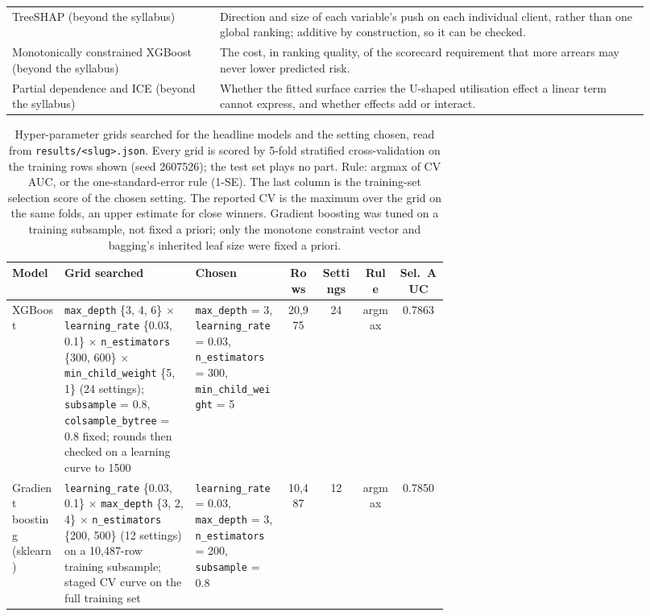 \begin{table}[htbp]
\begin{tabular}{@{}L{0.30\linewidth}L{0.62\linewidth}@{}}
    \midrule
    TreeSHAP (beyond the syllabus) & Direction and size of each variable's push on each individual client, rather than one global ranking; additive by construction, so it can be checked. \\
    Monotonically constrained XGBoost (beyond the syllabus) & The cost, in ranking quality, of the scorecard requirement that more arrears may never lower predicted risk. \\
    Partial dependence and ICE (beyond the syllabus) & Whether the fitted surface carries the U-shaped utilisation effect a linear term cannot express, and whether effects add or interact. \\
    \bottomrule
  \end{tabular}
\end{table}

\begin{table}[!htbp]
  \caption{Hyper-parameter grids searched for the headline models and the setting chosen, read from \texttt{results/<slug>.json}. Every grid is scored by 5-fold stratified cross-validation on the training rows shown (seed 2607526); the test set plays no part. Rule: argmax of CV AUC, or the one-standard-error rule (1-SE). The last column is the training-set selection score of the chosen setting. The reported CV is the maximum over the grid on the same folds, an upper estimate for close winners. Gradient boosting was tuned on a training subsample, not fixed a priori; only the monotone constraint vector and bagging's inherited leaf size were fixed a priori.}
  \label{tab:a-tuning}
  \centering
  \footnotesize
  \setlength{\tabcolsep}{2.5pt}
  \begin{tabular}{@{}L{0.12\linewidth}L{0.30\linewidth}L{0.21\linewidth}cccc@{}}
    \toprule
    Model & Grid searched & Chosen & Rows & Settings & Rule & Sel.\ AUC \\
    \midrule
    XGBoost & \texttt{max\_\allowbreak{}depth} \{3, 4, 6\} $\times$ \texttt{learning\_\allowbreak{}rate} \{0.03, 0.1\} $\times$ \texttt{n\_\allowbreak{}estimators} \{300, 600\} $\times$ \texttt{min\_\allowbreak{}child\_\allowbreak{}weight} \{5, 1\} (24 settings); \texttt{subsample} = 0.8, \texttt{colsample\_\allowbreak{}bytree} = 0.8 fixed; rounds then checked on a learning curve to 1500 & \texttt{max\_\allowbreak{}depth} = 3, \texttt{learning\_\allowbreak{}rate} = 0.03, \texttt{n\_\allowbreak{}estimators} = 300, \texttt{min\_\allowbreak{}child\_\allowbreak{}weight} = 5 & 20,975 & 24 & argmax & 0.7863 \\
    Gradient boosting (sklearn) & \texttt{learning\_\allowbreak{}rate} \{0.03, 0.1\} $\times$ \texttt{max\_\allowbreak{}depth} \{3, 2, 4\} $\times$ \texttt{n\_\allowbreak{}estimators} \{200, 500\} (12 settings) on a 10,487-row training subsample; staged CV curve on the full training set & \texttt{learning\_\allowbreak{}rate} = 0.03, \texttt{max\_\allowbreak{}depth} = 3, \texttt{n\_\allowbreak{}estimators} = 200, \texttt{subsample} = 0.8 & 10,487 & 12 & argmax & 0.7850 \\

\end{tabular}
\end{table}
